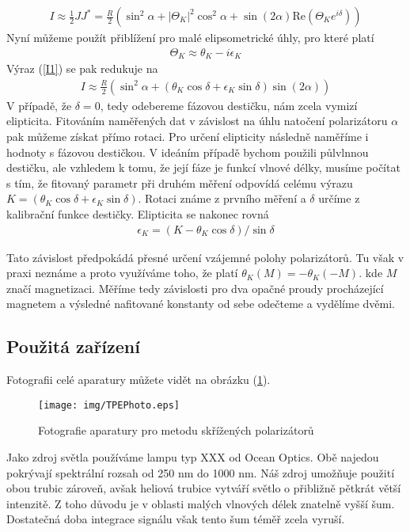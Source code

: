 \begin{eqnarray}
I\approx\frac{1}{2}JJ^*=\frac{R}{2}(\sin^2\alpha+|\Theta_K|^2\cos^2\alpha+\sin(2\alpha)\mbox{Re}(\Theta_Ke^{i\delta}))
\label{I1}
\end{eqnarray}
Nyní můžeme použít přiblížení pro malé elipsometrické úhly, pro které platí
\begin{eqnarray}
\Theta_K\approx\theta_K-i\epsilon_K
\end{eqnarray}
Výraz (\ref{I1}) se pak redukuje na
\begin{eqnarray}
I\approx\frac{R}{2}(\sin^2\alpha+(\theta_K\cos\delta+\epsilon_K\sin\delta)\sin(2\alpha))
\label{I2}
\end{eqnarray}
V  případě, že $\delta=0$, tedy odebereme fázovou destičku, nám zcela vymizí elipticita. Fitováním naměřených dat v závislost na úhlu natočení polarizátoru $\alpha$ pak můžeme získat přímo rotaci. Pro určení elipticity následně naměříme i hodnoty s fázovou destičkou. V ideáním případě bychom použili půlvlnnou destičku, ale vzhledem k tomu, že její fáze je funkcí vlnové délky, musíme počítat s tím, že fitovaný parametr při druhém měření odpovídá celému výrazu $K=(\theta_K\cos\delta+\epsilon_K\sin\delta)$. Rotaci známe z prvního měření a $\delta$ určíme z kalibrační funkce destičky. Elipticita se nakonec rovná
\begin{eqnarray}
\epsilon_K=(K-\theta_K\cos\delta)/\sin\delta
\end{eqnarray}

Tato závislost předpokádá přesné určení vzájemné polohy polarizátorů. Tu však v praxi neznáme a proto využíváme toho, že platí $\theta_K(M)=-\theta_K(-M)$. kde $M$ značí magnetizaci. Měříme tedy závislosti pro dva opačné proudy procházející magnetem a výsledné nafitované konstanty od sebe odečteme a vydělíme dvěmi.

\subsection{Použitá zařízení}
Fotografii celé aparatury můžete vidět na obrázku (\ref{TPE photo}).

\begin{figure}
\begin{center}
\texttt{[image: img/TPEPhoto.eps]}
\caption{Fotografie aparatury pro metodu skřížených polarizátorů}
\label{TPE photo}
\end{center}
\end{figure}

Jako zdroj světla používáme lampu typ XXX od Ocean Optics. Obě najedou pokrývají spektrální rozsah od 250 nm do 1000 nm. Náš zdroj umožňuje použití obou trubic zároveň, avšak heliová trubice vytváří světlo o přibližně pětkrát větší intenzitě. Z toho důvodu je v oblasti malých vlnových délek znatelně vyšší šum. Dostatečná doba integrace signálu však tento šum téměř zcela vyruší.

